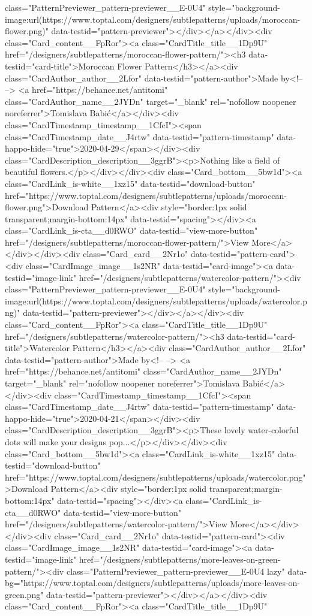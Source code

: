 class="PatternPreviewer_pattern-previewer__E-0U4" style="background-image:url(https://www.toptal.com/designers/subtlepatterns/uploads/moroccan-flower.png)" data-testid="pattern-previewer"></div></a></div><div class="Card_content__FpRor"><a class="CardTitle_title__1Dp9U" href="/designers/subtlepatterns/moroccan-flower-pattern/"><h3 data-testid="card-title">Moroccan Flower Pattern</h3></a><div class="CardAuthor_author__2Lfor" data-testid="pattern-author">Made by<!-- --> <a href="https://behance.net/antitomi" class="CardAuthor_name__2JYDn" target="_blank" rel="nofollow noopener noreferrer">Tomislava Babić</a></div><div class="CardTimestamp_timestamp__1CfcI"><span class="CardTimestamp_date__J4rtw" data-testid="pattern-timestamp" data-happo-hide="true">2020-04-29</span></div><div class="CardDescription_description__3ggrB"><p>Nothing like a field of beautiful flowers.</p></div></div><div class="Card_bottom__5bw1d"><a class="CardLink_is-white__1xz15" data-testid="download-button" href="https://www.toptal.com/designers/subtlepatterns/uploads/moroccan-flower.png">Download Pattern</a><div style="border:1px solid transparent;margin-bottom:14px" data-testid="spacing"></div><a class="CardLink_is-cta__d0RWO" data-testid="view-more-button" href="/designers/subtlepatterns/moroccan-flower-pattern/">View More</a></div></div><div class="Card_card__2Nr1o" data-testid="pattern-card"><div class="CardImage_image__1s2NR" data-testid="card-image"><a data-testid="image-link" href="/designers/subtlepatterns/watercolor-pattern/"><div class="PatternPreviewer_pattern-previewer__E-0U4" style="background-image:url(https://www.toptal.com/designers/subtlepatterns/uploads/watercolor.png)" data-testid="pattern-previewer"></div></a></div><div class="Card_content__FpRor"><a class="CardTitle_title__1Dp9U" href="/designers/subtlepatterns/watercolor-pattern/"><h3 data-testid="card-title">Watercolor Pattern</h3></a><div class="CardAuthor_author__2Lfor" data-testid="pattern-author">Made by<!-- --> <a href="https://behance.net/antitomi" class="CardAuthor_name__2JYDn" target="_blank" rel="nofollow noopener noreferrer">Tomislava Babić</a></div><div class="CardTimestamp_timestamp__1CfcI"><span class="CardTimestamp_date__J4rtw" data-testid="pattern-timestamp" data-happo-hide="true">2020-04-21</span></div><div class="CardDescription_description__3ggrB"><p>These lovely water-colorful dots will make your designs pop...</p></div></div><div class="Card_bottom__5bw1d"><a class="CardLink_is-white__1xz15" data-testid="download-button" href="https://www.toptal.com/designers/subtlepatterns/uploads/watercolor.png">Download Pattern</a><div style="border:1px solid transparent;margin-bottom:14px" data-testid="spacing"></div><a class="CardLink_is-cta__d0RWO" data-testid="view-more-button" href="/designers/subtlepatterns/watercolor-pattern/">View More</a></div></div><div class="Card_card__2Nr1o" data-testid="pattern-card"><div class="CardImage_image__1s2NR" data-testid="card-image"><a data-testid="image-link" href="/designers/subtlepatterns/more-leaves-on-green-pattern/"><div class="PatternPreviewer_pattern-previewer__E-0U4 lazy" data-bg="https://www.toptal.com/designers/subtlepatterns/uploads/more-leaves-on-green.png" data-testid="pattern-previewer"></div></a></div><div class="Card_content__FpRor"><a class="CardTitle_title__1Dp9U" 